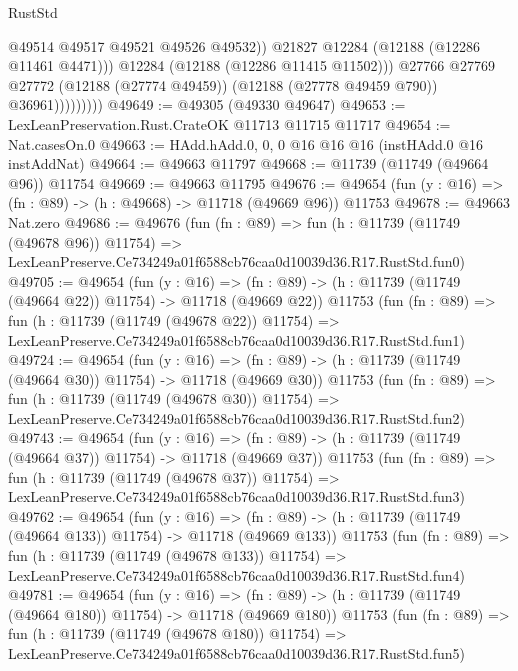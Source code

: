 \begin{lexlean}{RustStd}
\begin{coremodule}
                              @49514
                              @49517
                              @49521
                              @49526
                              @49532))
                          @21827
                          @12284
                          (@12188 (@12286 @11461 @4471)))
                        @12284
                        (@12188 (@12286 @11415 @11502)))
                      @27766
                      @27769
                      @27772
                      (@12188 (@27774 @49459))
                      (@12188 (@27778 @49459 @790))
                      @36961)))))))))
@49649 := @49305 (@49330 @49647)
@49653 := LexLeanPreservation.Rust.CrateOK @11713 @11715 @11717
@49654 := Nat.casesOn.{0}
@49663 := HAdd.hAdd.{0, 0, 0} @16 @16 @16 (instHAdd.{0} @16 instAddNat)
@49664 := @49663 @11797
@49668 := @11739 (@11749 (@49664 @96)) @11754
@49669 := @49663 @11795
@49676 := @49654 (fun (y : @16) => (fn : @89) -> (h : @49668) -> @11718 (@49669 @96)) @11753
@49678 := @49663 Nat.zero
@49686 := @49676
    (fun (fn : @89) =>
    fun (h : @11739 (@11749 (@49678 @96)) @11754) =>
    LexLeanPreserve.Ce734249a01f6588cb76caa0d10039d36.R17.RustStd.fun0)
@49705 := @49654
    (fun (y : @16) =>
    (fn : @89) -> (h : @11739 (@11749 (@49664 @22)) @11754) -> @11718 (@49669 @22))
    @11753
    (fun (fn : @89) =>
    fun (h : @11739 (@11749 (@49678 @22)) @11754) =>
    LexLeanPreserve.Ce734249a01f6588cb76caa0d10039d36.R17.RustStd.fun1)
@49724 := @49654
    (fun (y : @16) =>
    (fn : @89) -> (h : @11739 (@11749 (@49664 @30)) @11754) -> @11718 (@49669 @30))
    @11753
    (fun (fn : @89) =>
    fun (h : @11739 (@11749 (@49678 @30)) @11754) =>
    LexLeanPreserve.Ce734249a01f6588cb76caa0d10039d36.R17.RustStd.fun2)
@49743 := @49654
    (fun (y : @16) =>
    (fn : @89) -> (h : @11739 (@11749 (@49664 @37)) @11754) -> @11718 (@49669 @37))
    @11753
    (fun (fn : @89) =>
    fun (h : @11739 (@11749 (@49678 @37)) @11754) =>
    LexLeanPreserve.Ce734249a01f6588cb76caa0d10039d36.R17.RustStd.fun3)
@49762 := @49654
    (fun (y : @16) =>
    (fn : @89) -> (h : @11739 (@11749 (@49664 @133)) @11754) -> @11718 (@49669 @133))
    @11753
    (fun (fn : @89) =>
    fun (h : @11739 (@11749 (@49678 @133)) @11754) =>
    LexLeanPreserve.Ce734249a01f6588cb76caa0d10039d36.R17.RustStd.fun4)
@49781 := @49654
    (fun (y : @16) =>
    (fn : @89) -> (h : @11739 (@11749 (@49664 @180)) @11754) -> @11718 (@49669 @180))
    @11753
    (fun (fn : @89) =>
    fun (h : @11739 (@11749 (@49678 @180)) @11754) =>
    LexLeanPreserve.Ce734249a01f6588cb76caa0d10039d36.R17.RustStd.fun5)

\end{coremodule}
\end{lexlean}
